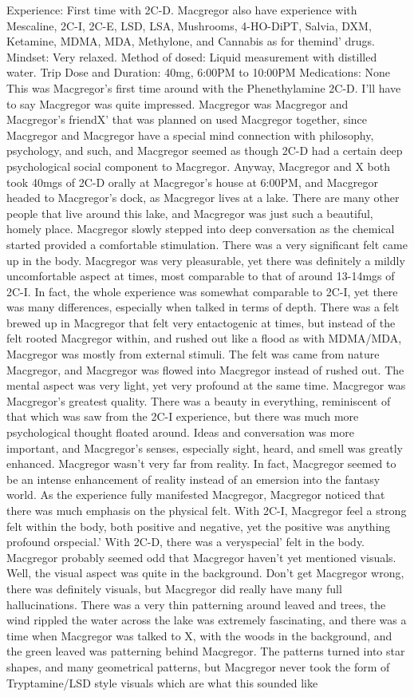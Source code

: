 \documentclass[12pt]{book}
\begin{document}
Experience: First time with 2C-D. Macgregor also have experience with Mescaline, 2C-I, 2C-E, LSD, LSA, Mushrooms, 4-HO-DiPT, Salvia, DXM, Ketamine, MDMA, MDA, Methylone, and Cannabis as for themind' drugs. Mindset: Very relaxed. Method of dosed: Liquid measurement with distilled water. Trip Dose and Duration: 40mg, 6:00PM to 10:00PM Medications: None This was Macgregor's first time around with the Phenethylamine 2C-D. I'll have to say Macgregor was quite impressed. Macgregor was Macgregor and Macgregor's friendX' that was planned on used Macgregor together, since Macgregor and Macgregor have a special mind connection with philosophy, psychology, and such, and Macgregor seemed as though 2C-D had a certain deep psychological social component to Macgregor. Anyway, Macgregor and X both took 40mgs of 2C-D orally at Macgregor's house at 6:00PM, and Macgregor headed to Macgregor's dock, as Macgregor lives at a lake. There are many other people that live around this lake, and Macgregor was just such a beautiful, homely place. Macgregor slowly stepped into deep conversation as the chemical started provided a comfortable stimulation. There was a very significant felt came up in the body. Macgregor was very pleasurable, yet there was definitely a mildly uncomfortable aspect at times, most comparable to that of around 13-14mgs of 2C-I. In fact, the whole experience was somewhat comparable to 2C-I, yet there was many differences, especially when talked in terms of depth. There was a felt brewed up in Macgregor that felt very entactogenic at times, but instead of the felt rooted Macgregor within, and rushed out like a flood as with MDMA/MDA, Macgregor was mostly from external stimuli. The felt was came from nature Macgregor, and Macgregor was flowed into Macgregor instead of rushed out. The mental aspect was very light, yet very profound at the same time. Macgregor was Macgregor's greatest quality. There was a beauty in everything, reminiscent of that which was saw from the 2C-I experience, but there was much more psychological thought floated around. Ideas and conversation was more important, and Macgregor's senses, especially sight, heard, and smell was greatly enhanced. Macgregor wasn't very far from reality. In fact, Macgregor seemed to be an intense enhancement of reality instead of an emersion into the fantasy world. As the experience fully manifested Macgregor, Macgregor noticed that there was much emphasis on the physical felt. With 2C-I, Macgregor feel a strong felt within the body, both positive and negative, yet the positive was anything profound orspecial.' With 2C-D, there was a veryspecial' felt in the body. Macgregor probably seemed odd that Macgregor haven't yet mentioned visuals. Well, the visual aspect was quite in the background. Don't get Macgregor wrong, there was definitely visuals, but Macgregor did really have many full hallucinations. There was a very thin patterning around leaved and trees, the wind rippled the water across the lake was extremely fascinating, and there was a time when Macgregor was talked to X, with the woods in the background, and the green leaved was patterning behind Macgregor. The patterns turned into star shapes, and many geometrical patterns, but Macgregor never took the form of Tryptamine/LSD style visuals which are what this sounded like 
\end{document}

